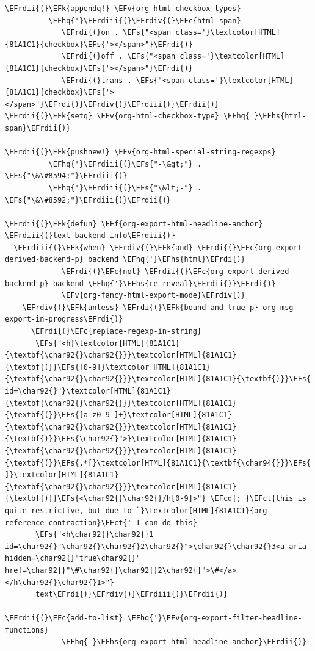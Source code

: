 \documentclass{scrartcl}
\newcommand{\EFk}[1]{\textcolor{EFk}{#1}} %
\newcommand{\EFs}[1]{\textcolor{EFs}{#1}} %
\newcommand{\EFct}[1]{\textcolor{EFct}{#1}} %
\newcommand{\EFc}[1]{\textcolor{EFc}{#1}} %
\newcommand{\EFv}[1]{\textcolor{EFv}{#1}} %
\newcommand{\EFf}[1]{\textcolor{EFf}{#1}} %
\newcommand{\EFcd}[1]{\textcolor{EFcd}{#1}} %
\newcommand{\EFhq}[1]{#1} %
\newcommand{\EFhs}[1]{#1} %
\newcommand{\EFrdi}[1]{#1} %
\newcommand{\EFrdii}[1]{#1} %
\newcommand{\EFrdiii}[1]{#1} %
\newcommand{\EFrdiv}[1]{#1} %
\begin{document}
\begin{Code}
\begin{Verbatim}[]
\EFrdii{(}\EFk{appendq!} \EFv{org-html-checkbox-types}
          \EFhq{'}\EFrdiii{(}\EFrdiv{(}\EFc{html-span}
             \EFrdi{(}on . \EFs{"<span class='}\textcolor[HTML]{81A1C1}{checkbox}\EFs{'></span>"}\EFrdi{)}
             \EFrdi{(}off . \EFs{"<span class='}\textcolor[HTML]{81A1C1}{checkbox}\EFs{'></span>"}\EFrdi{)}
             \EFrdi{(}trans . \EFs{"<span class='}\textcolor[HTML]{81A1C1}{checkbox}\EFs{'></span>"}\EFrdi{)}\EFrdiv{)}\EFrdiii{)}\EFrdii{)}
\EFrdii{(}\EFk{setq} \EFv{org-html-checkbox-type} \EFhq{'}\EFhs{html-span}\EFrdii{)}

\EFrdii{(}\EFk{pushnew!} \EFv{org-html-special-string-regexps}
          \EFhq{'}\EFrdiii{(}\EFs{"-\&gt;"} . \EFs{"\&\#8594;"}\EFrdiii{)}
          \EFhq{'}\EFrdiii{(}\EFs{"\&lt;-"} . \EFs{"\&\#8592;"}\EFrdiii{)}\EFrdii{)}

\EFrdii{(}\EFk{defun} \EFf{org-export-html-headline-anchor} \EFrdiii{(}text backend info\EFrdiii{)}
  \EFrdiii{(}\EFk{when} \EFrdiv{(}\EFk{and} \EFrdi{(}\EFc{org-export-derived-backend-p} backend \EFhq{'}\EFhs{html}\EFrdi{)}
             \EFrdi{(}\EFc{not} \EFrdii{(}\EFc{org-export-derived-backend-p} backend \EFhq{'}\EFhs{re-reveal}\EFrdii{)}\EFrdi{)}
             \EFv{org-fancy-html-export-mode}\EFrdiv{)}
    \EFrdiv{(}\EFk{unless} \EFrdi{(}\EFk{bound-and-true-p} org-msg-export-in-progress\EFrdi{)}
      \EFrdi{(}\EFc{replace-regexp-in-string}
       \EFs{"<h}\textcolor[HTML]{81A1C1}{\textbf{\char92{}\char92{}}}\textcolor[HTML]{81A1C1}{\textbf{(}}\EFs{[0-9]}\textcolor[HTML]{81A1C1}{\textbf{\char92{}\char92{}}}\textcolor[HTML]{81A1C1}{\textbf{)}}\EFs{ id=\char92{}"}\textcolor[HTML]{81A1C1}{\textbf{\char92{}\char92{}}}\textcolor[HTML]{81A1C1}{\textbf{(}}\EFs{[a-z0-9-]+}\textcolor[HTML]{81A1C1}{\textbf{\char92{}\char92{}}}\textcolor[HTML]{81A1C1}{\textbf{)}}\EFs{\char92{}">}\textcolor[HTML]{81A1C1}{\textbf{\char92{}\char92{}}}\textcolor[HTML]{81A1C1}{\textbf{(}}\EFs{.*[}\textcolor[HTML]{81A1C1}{\textbf{\char94{}}}\EFs{ ]}\textcolor[HTML]{81A1C1}{\textbf{\char92{}\char92{}}}\textcolor[HTML]{81A1C1}{\textbf{)}}\EFs{<\char92{}\char92{}/h[0-9]>"} \EFcd{; }\EFct{this is quite restrictive, but due to `}\textcolor[HTML]{81A1C1}{org-reference-contraction}\EFct{' I can do this}
       \EFs{"<h\char92{}\char92{}1 id=\char92{}"\char92{}\char92{}2\char92{}">\char92{}\char92{}3<a aria-hidden=\char92{}"true\char92{}" href=\char92{}"\#\char92{}\char92{}2\char92{}">\#</a> </h\char92{}\char92{}1>"}
       text\EFrdi{)}\EFrdiv{)}\EFrdiii{)}\EFrdii{)}

\EFrdii{(}\EFc{add-to-list} \EFhq{'}\EFv{org-export-filter-headline-functions}
             \EFhq{'}\EFhs{org-export-html-headline-anchor}\EFrdii{)}


\end{Verbatim}
\end{Code}
\end{document}
